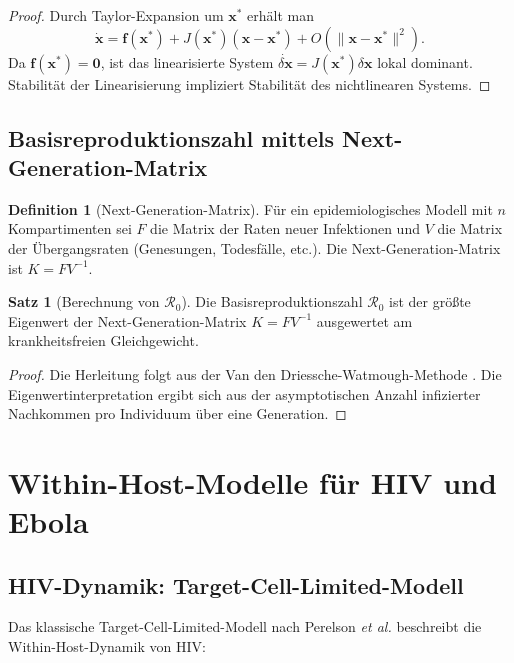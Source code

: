 ﻿\documentclass[a4paper,12pt]{article}
\theoremstyle{definition}
\newtheorem{definition}{Definition}
\newtheorem{satz}{Satz}
\begin{document}
\begin{proof}
Durch Taylor-Expansion um $\mathbf{x}^*$ erhält man
\[
\dot{\mathbf{x}} = \mathbf{f}(\mathbf{x}^*) + J(\mathbf{x}^*)(\mathbf{x} - \mathbf{x}^*) + O(\|\mathbf{x} - \mathbf{x}^*\|^2).
\]
Da $\mathbf{f}(\mathbf{x}^*) = \mathbf{0}$, ist das linearisierte System $\dot{\delta\mathbf{x}} = J(\mathbf{x}^*) \delta\mathbf{x}$ lokal dominant. Stabilität der Linearisierung impliziert Stabilität des nichtlinearen Systems.
\end{proof}

\subsection{Basisreproduktionszahl mittels Next-Generation-Matrix}

\begin{definition}[Next-Generation-Matrix]
Für ein epidemiologisches Modell mit $n$ Kompartimenten sei $F$ die Matrix der Raten neuer Infektionen und $V$ die Matrix der Übergangsraten (Genesungen, Todesfälle, etc.). Die Next-Generation-Matrix ist $K = FV^{-1}$.
\end{definition}

\begin{satz}[Berechnung von $\mathcal{R}_0$]
Die Basisreproduktionszahl $\mathcal{R}_0$ ist der größte Eigenwert der Next-Generation-Matrix $K = FV^{-1}$ ausgewertet am krankheitsfreien Gleichgewicht.
\end{satz}

\begin{proof}
Die Herleitung folgt aus der Van den Driessche-Watmough-Methode \cite{diekmann2010understanding}. Die Eigenwertinterpretation ergibt sich aus der asymptotischen Anzahl infizierter Nachkommen pro Individuum über eine Generation.
\end{proof}

\section{Within-Host-Modelle für HIV und Ebola}

\subsection{HIV-Dynamik: Target-Cell-Limited-Modell}

Das klassische Target-Cell-Limited-Modell nach Perelson \textit{et al.} \cite{perelson1993dynamics} beschreibt die Within-Host-Dynamik von HIV:
\end{document}
